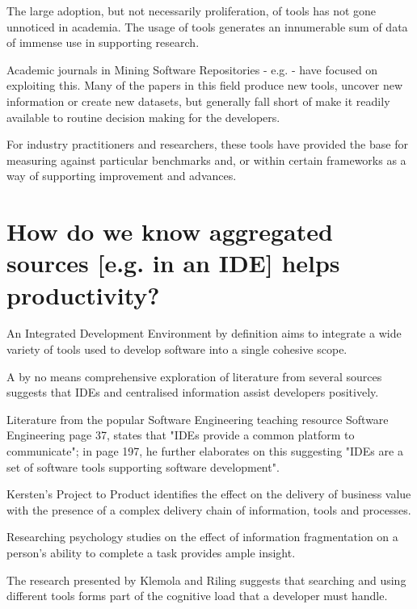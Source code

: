 The large adoption, but not necessarily proliferation, of tools has not gone unnoticed in academia. The usage of tools generates an innumerable sum of data of immense use in supporting research.

Academic journals in Mining Software Repositories - e.g. \cite{Storey:2019:3341883} - have focused on exploiting this. Many of the papers in this field produce new tools, uncover new information or create new datasets, but generally fall short of make it readily available to routine decision making for the developers.

For industry practitioners and researchers, these tools have provided the base for measuring against particular benchmarks and, or within certain frameworks as a way of supporting improvement and advances.


\section{How do we know aggregated sources [e.g. in an IDE] helps productivity?}

An Integrated Development Environment by definition aims to integrate a wide variety of tools used to develop software into a single cohesive scope. 

A by no means comprehensive exploration of literature from several sources suggests that IDEs and centralised information assist developers positively. 

Literature from the popular Software Engineering teaching resource Software Engineering \parencite{Sommerville:2010:SE:1841764} page 37, states that "IDEs provide a common platform to communicate"; in page 197, he further elaborates on this suggesting "IDEs are a set of software tools supporting software development".

Kersten's Project to Product \parencite*{kersten2018projecproduct} identifies the effect on the delivery of business value with the presence of a complex delivery chain of information, tools and processes.

Researching psychology studies on the effect of information fragmentation on a person's ability to complete a task provides ample insight. 

The research presented by Klemola and Riling \parencite*{klemola2002modeling} suggests that searching and using different tools forms part of the cognitive load that a developer must handle.

